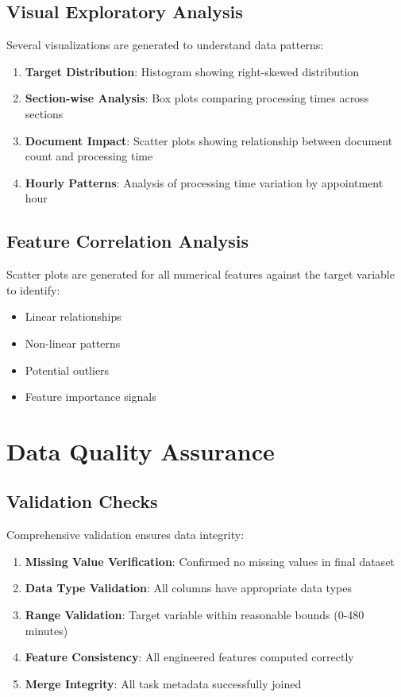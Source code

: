 \documentclass[12pt,a4paper]{article}
\begin{document}
\subsection{Visual Exploratory Analysis}

Several visualizations are generated to understand data patterns:

\begin{enumerate}
    \item \textbf{Target Distribution}: Histogram showing right-skewed distribution
    \item \textbf{Section-wise Analysis}: Box plots comparing processing times across sections
    \item \textbf{Document Impact}: Scatter plots showing relationship between document count and processing time
    \item \textbf{Hourly Patterns}: Analysis of processing time variation by appointment hour
\end{enumerate}

\subsection{Feature Correlation Analysis}

Scatter plots are generated for all numerical features against the target variable to identify:

\begin{itemize}
    \item Linear relationships
    \item Non-linear patterns
    \item Potential outliers
    \item Feature importance signals
\end{itemize}

\section{Data Quality Assurance}

\subsection{Validation Checks}

Comprehensive validation ensures data integrity:

\begin{enumerate}
    \item \textbf{Missing Value Verification}: Confirmed no missing values in final dataset
    \item \textbf{Data Type Validation}: All columns have appropriate data types
    \item \textbf{Range Validation}: Target variable within reasonable bounds (0-480 minutes)
    \item \textbf{Feature Consistency}: All engineered features computed correctly
    \item \textbf{Merge Integrity}: All task metadata successfully joined
\end{enumerate}
\end{document}

